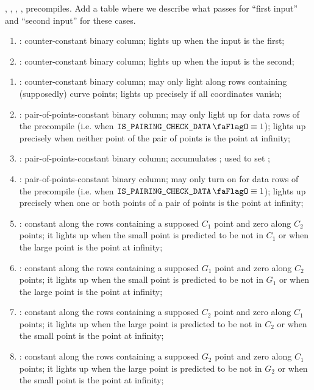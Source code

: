 ,
,
,
,
precompiles.
\specTodo{} Add a table where we describe what passes for ``first input'' and ``second input'' for these cases.
\begin{enumerate}[resume]
    \item
        \isFirstInput:
        counter-constant binary column;
        lights up when the input is the first;
    \item
        \isSecondInput:
        counter-constant binary column;
        lights up when the input is the second;
\end{enumerate}
\begin{enumerate}[resume]
    \item
        \isInfinity:
        counter-constant binary column;
        may only light along rows containing (supposedly) curve points;
        lights up precisely if all coordinates vanish;
    \item
        \nontrivialPairOfPoints:
        pair-of-points-constant binary column;
        may only light up for data rows of the  precompile (i.e. when $\isBlsPairingCheckData \equiv 1$);
        lights up precisely when neither point of the pair of points is the point at infinity;
    \item
        \nontrivialPairOfPointsAcc:
        pair-of-points-constant binary column;
        accumulates \nontrivialPairOfPoints{};
        used to set \wellformedDataNontrivial{};
    \item
        \specTodo{}
        \deprecated{}
        \both{\nontrivialPairOfPoints}:
        pair-of-points-constant binary column;
        may only turn on for data rows of the  precompile (i.e. when $\isBlsPairingCheckData \equiv 1$);
        lights up precisely when one or both points of a pair of points is the point at infinity;
    \item
        \both{\cOneMembershipTestRequired}:
        constant along the rows containing a supposed $C_1$ point and zero along $C_2$ points;
        it lights up when the small point is predicted to be not in $C_1$ or when the large point is the point at infinity;
    \item
        \both{\gOneMembershipTestRequired}:
        constant along the rows containing a supposed $G_1$ point and zero along $C_2$ points;
        it lights up when the small point is predicted to be not in $G_1$ or when the large point is the point at infinity;
    \item
        \both{\cTwoMembershipTestRequired}:
        constant along the rows containing a supposed $C_2$ point and zero along $C_1$ points;
        it lights up when the large point is predicted to be not in $C_2$ or when the small point is the point at infinity;
    \item
        \both{\gTwoMembershipTestRequired}:
        constant along the rows containing a supposed $G_2$ point and zero along $C_1$ points;
        it lights up when the large point is predicted to be not in $G_2$ or when the small point is the point at infinity;
\end{enumerate}
